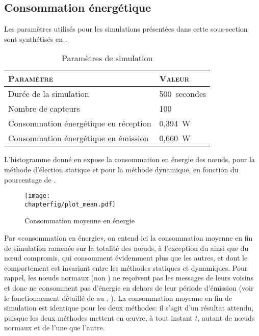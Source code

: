     \subsection{Consommation énergétique}

Les paramètres utilisés pour les simulations présentées dans cette sous-section sont synthétisés en .
\begin{table}[ht]
    \centering
    \caption{Paramètres de simulation}\label{sa:table:parametres2}
    \medskip
    \begin{tabular}{ll}
        \toprule
        \textsc{Paramètre}                    & \textsc{Valeur}\\
        \midrule
        Durée de la simulation                & 500~secondes\\
        Nombre de capteurs                    & 100\\
        Consommation énergétique en réception & 0,394~W\\
        Consommation énergétique en émission  & 0,660~W\\
        \bottomrule
    \end{tabular}
\end{table}

L'histogramme donné en  expose la consommation en énergie des nœuds, pour la méthode d'élection statique et pour la méthode dynamique, en fonction du pourcentage de \cns.
\begin{figure}[!b]
    \centering
    \texttt{[image: \\chapterfig/plot\_mean.pdf]}
    \caption{Consommation moyenne en énergie}\label{sa:fig:conso-moyenne}
\end{figure}
Par «consommation en énergie», on entend ici la consommation moyenne en fin de simulation ramenée sur la totalité des nœuds, à l'exception du \ch ainsi que du nœud compromis, qui consomment évidemment plus que les autres, et dont le comportement est invariant entre les méthodes statiques et dynamiques.
Pour rappel, les nœuds normaux (non \cns) ne reçoivent pas les messages de leurs voisins et donc ne consomment pas d'énergie en dehors de leur période d'émission (voir le fonctionnement détaillé de \leach au , ).
La consommation moyenne en fin de simulation est identique pour les deux méthodes: il s'agit d'un résultat attendu, puisque les deux méthodes mettent en œuvre, à tout instant $t$, autant de nœuds normaux et de \cns l'une que l'autre.

